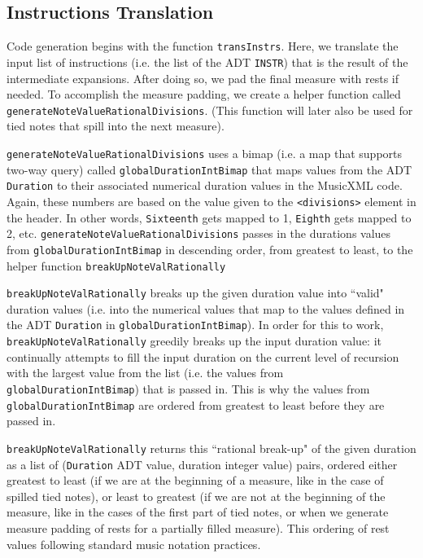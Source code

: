 \documentclass{report}
\begin{document}
\subsection{Instructions Translation}

Code generation begins with the function \verb.transInstrs.. Here, we translate the input list of instructions (i.e. the list of the ADT \verb.INSTR.) that is the result of the intermediate expansions. After doing so, we pad the final measure with rests if needed. To accomplish the measure padding, we create a helper function called \verb.generateNoteValueRationalDivisions.. (This function will later also be used for tied notes that spill into the next measure).

\verb.generateNoteValueRationalDivisions. uses a bimap (i.e. a map that supports two-way query) called \verb.globalDurationIntBimap. that maps values from the ADT \verb.Duration. to their associated numerical duration values in the MusicXML code. Again, these numbers are based on the value given to the \verb.<divisions>. element in the header. In other words, \verb.Sixteenth. gets mapped to 1, \verb.Eighth. gets mapped to 2, etc. \verb.generateNoteValueRationalDivisions. passes in the durations values from \verb.globalDurationIntBimap. in descending order, from greatest to least, to the helper function \verb.breakUpNoteValRationally. 

 \verb.breakUpNoteValRationally. breaks up the given duration value into ``valid" duration values (i.e. into the numerical values that map to the values defined in the ADT \verb.Duration. in \verb.globalDurationIntBimap.). In order for this to work,  \verb.breakUpNoteValRationally. greedily breaks up the input duration value: it continually attempts to fill the input duration on the current level of recursion with the largest value from the list (i.e. the values from \verb.globalDurationIntBimap.) that is passed in. This is why the values from \verb.globalDurationIntBimap. are ordered from greatest to least before they are passed in. 

\verb.breakUpNoteValRationally. returns this ``rational break-up" of the given duration as a list of (\verb.Duration. ADT value, duration integer value) pairs, ordered either greatest to least (if we are at the beginning of a measure, like in the case of spilled  tied notes), or least to greatest (if we are not at the beginning of the measure, like in the cases of the first part of tied notes, or when we generate measure padding of rests for a partially filled measure). This ordering of rest values following standard music notation practices. 
\end{document}
